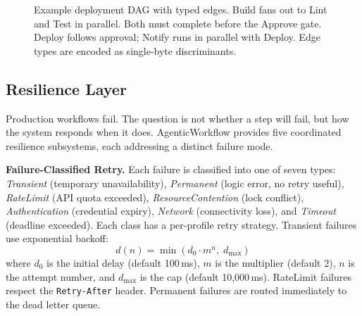 \documentclass[10pt, twocolumn]{article}
\begin{document}
\begin{figure}[t]
\centering
{}
\caption{Example deployment DAG with typed edges. Build fans out to Lint and Test in parallel. Both must complete before the Approve gate. Deploy follows approval; Notify runs in parallel with Deploy. Edge types are encoded as single-byte discriminants.}
\label{fig:dag}
\end{figure}

\subsection{Resilience Layer}\label{sec:resilience}

Production workflows fail. The question is not whether a step will fail, but how the system responds when it does. AgenticWorkflow provides five coordinated resilience subsystems, each addressing a distinct failure mode.

\textbf{Failure-Classified Retry.} Each failure is classified into one of seven types: \emph{Transient} (temporary unavailability), \emph{Permanent} (logic error, no retry useful), \emph{RateLimit} (API quota exceeded), \emph{ResourceContention} (lock conflict), \emph{Authentication} (credential expiry), \emph{Network} (connectivity loss), and \emph{Timeout} (deadline exceeded). Each class has a per-profile retry strategy. Transient failures use exponential backoff:
\begin{equation}
d(n) = \min\left(d_0 \cdot m^n,\; d_{\max}\right)
\label{eq:backoff}
\end{equation}
where $d_0$ is the initial delay (default 100\,ms), $m$ is the multiplier (default 2), $n$ is the attempt number, and $d_{\max}$ is the cap (default 10{,}000\,ms). RateLimit failures respect the \texttt{Retry-After} header. Permanent failures are routed immediately to the dead letter queue.
\end{document}
